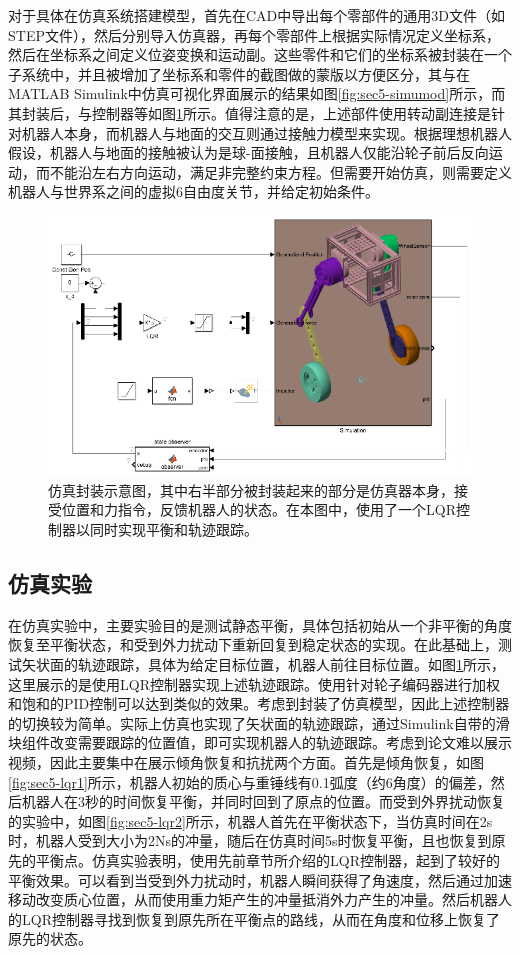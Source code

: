 对于具体在仿真系统搭建模型，首先在CAD中导出每个零部件的通用3D文件（如STEP文件），然后分别导入仿真器，再每个零部件上根据实际情况定义坐标系，然后在坐标系之间定义位姿变换和运动副。这些零件和它们的坐标系被封装在一个子系统中，并且被增加了坐标系和零件的截图做的蒙版以方便区分，其与在MATLAB Simulink中仿真可视化界面展示的结果如图\ref{fig:sec5-simumod}所示，而其封装后，与控制器等如图\ref{fig:sec5-simuabs}所示。值得注意的是，上述部件使用转动副连接是针对机器人本身，而机器人与地面的交互则通过接触力模型来实现。根据理想机器人假设，机器人与地面的接触被认为是球-面接触，且机器人仅能沿轮子前后反向运动，而不能沿左右方向运动，满足非完整约束方程。但需要开始仿真，则需要定义机器人与世界系之间的虚拟6自由度关节，并给定初始条件。


\begin{figure}
  \centering
  \includegraphics[width=0.85\linewidth]{figures/Sec5/simuabs.png}
  \caption{
  仿真封装示意图，其中右半部分被封装起来的部分是仿真器本身，接受位置和力指令，反馈机器人的状态。在本图中，使用了一个LQR控制器以同时实现平衡和轨迹跟踪。
  }
  \label{fig:sec5-simuabs}
   \vspace{6pt}
\end{figure}

\subsection{仿真实验}
在仿真实验中，主要实验目的是测试静态平衡，具体包括初始从一个非平衡的角度恢复至平衡状态，和受到外力扰动下重新回复到稳定状态的实现。在此基础上，测试矢状面的轨迹跟踪，具体为给定目标位置，机器人前往目标位置。如图\ref{fig:sec5-simuabs}所示，这里展示的是使用LQR控制器实现上述轨迹跟踪。使用针对轮子编码器进行加权和饱和的PID控制可以达到类似的效果。考虑到封装了仿真模型，因此上述控制器的切换较为简单。实际上仿真也实现了矢状面的轨迹跟踪，通过Simulink自带的滑块组件改变需要跟踪的位置值，即可实现机器人的轨迹跟踪。考虑到论文难以展示视频，因此主要集中在展示倾角恢复和抗扰两个方面。首先是倾角恢复，如图\ref{fig:sec5-lqr1}所示，机器人初始的质心与重锤线有0.1弧度（约6角度）的偏差，然后机器人在3秒的时间恢复平衡，并同时回到了原点的位置。而受到外界扰动恢复的实验中，如图\ref{fig:sec5-lqr2}所示，机器人首先在平衡状态下，当仿真时间在2s时，机器人受到大小为2Ns的冲量，随后在仿真时间5s时恢复平衡，且也恢复到原先的平衡点。仿真实验表明，使用先前章节所介绍的LQR控制器，起到了较好的平衡效果。可以看到当受到外力扰动时，机器人瞬间获得了角速度，然后通过加速移动改变质心位置，从而使用重力矩产生的冲量抵消外力产生的冲量。然后机器人的LQR控制器寻找到恢复到原先所在平衡点的路线，从而在角度和位移上恢复了原先的状态。

